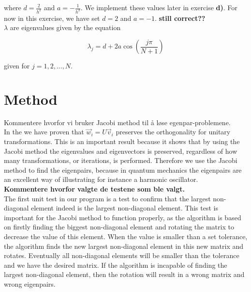\documentclass{article}
\begin{document}
where $d = \frac{2}{h^2}$ and $a = - \frac{1}{h^2}$. We implement these values later in exercise \textbf{d)}. For now in this exercise, we have set $d = 2$ and $a = - 1$.
\textbf{still correct??} \\

$\lambda$ are eigenvalues given by the equation

\begin{equation}  \label{eq:eigenvalues}
    \lambda_j = d + 2a \cos \left( \frac{j \pi }{N + 1} \right)
\end{equation}

given for $ j = 1, 2, ..., N$. \\





\vspace{1cm}

\section{Method} \label{sec:Method}

Kommentere hvorfor vi bruker Jacobi method til å løse egenpar-problemene. \\

In the  we have proven that $\vec{w}_i = U \vec{v}_i$ preserves the orthogonality for unitary transformations. This is an important result because it shows that by using the Jacobi method the eigenvalues and eigenvectors is preserved, regardless of how many transformations, or iterations, is performed. Therefore we use the Jacobi method to find the eigenpairs, because in quantum mechanics the eigenpairs are an excellent way of illustrating for instance a harmonic oscillator. \\

\textbf{Kommentere hvorfor valgte de testene som ble valgt.} \\

The first unit test in our program is a test to confirm that the largest non-diagonal element indeed is the largest non-diagonal element. This test is important for the Jacobi method to function properly, as the algorithm is based on firstly finding the biggest non-diagonal element and rotating the matrix to decrease the value of this element. When the value is smaller than a set tolerance, the algorithm finds the new largest non-diagonal element in this new matrix and rotates. Eventually all non-diagonal elements will be smaller than the tolerance and we have the desired matrix. If the algorithm is incapable of finding the largest non-diagonal element, then the rotation will result in a wrong matrix and wrong eigenpairs. \\
\end{document}
